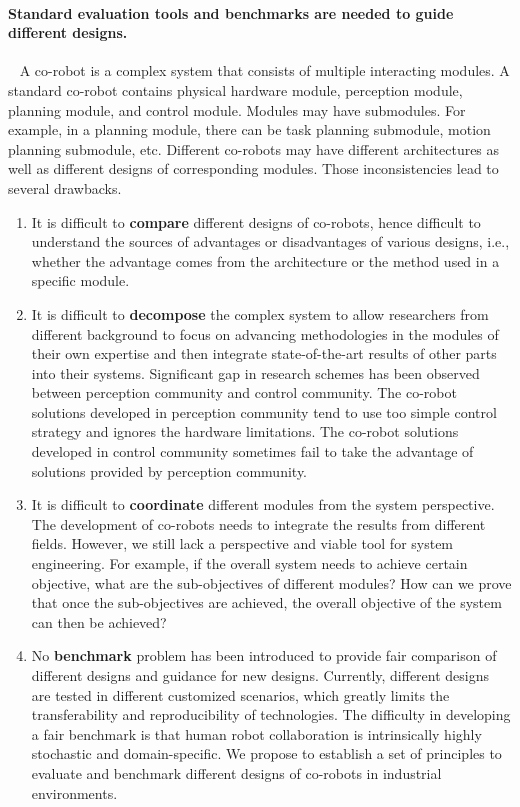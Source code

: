 \paragraph*{Standard evaluation tools and benchmarks are needed to guide different designs. }~
A co-robot is a complex system that consists of multiple interacting modules. A standard co-robot contains physical hardware module, perception module, planning module, and control module. Modules may have submodules. For example, in a planning module, there can be task planning submodule, motion planning submodule, etc. Different co-robots may have different architectures as well as different designs of corresponding modules. Those inconsistencies lead to several drawbacks.
\begin{enumerate}
	\item It is difficult to \textbf{compare} different designs of co-robots, hence difficult to understand the sources of advantages or disadvantages of various designs, i.e., whether the advantage comes from the architecture or the method used in a specific module.
	\item It is difficult to \textbf{decompose} the complex system to allow researchers from different background to focus on advancing methodologies in the modules of their own expertise and then integrate state-of-the-art results of other parts into their systems. Significant gap in research schemes has been observed between perception community and control community. The co-robot solutions developed in perception community tend to use too simple control strategy and ignores the hardware limitations. The co-robot solutions developed in control community sometimes fail to take the advantage of solutions provided by perception community.
	\item It is difficult to \textbf{coordinate} different modules from the system perspective. The development of co-robots needs to integrate the results from different fields. However, we still lack a perspective and viable tool for system engineering. For example, if the overall system needs to achieve certain objective, what are the sub-objectives of different modules? How can we prove that once the sub-objectives are achieved, the overall objective of the system can then be achieved?
	\item No \textbf{benchmark} problem has been introduced to provide fair comparison of different designs and guidance for new designs. Currently, different designs are tested in different customized scenarios, which greatly limits the transferability and reproducibility of technologies. The difficulty in developing a fair benchmark is that human robot collaboration is intrinsically highly stochastic and domain-specific.  
	We propose to establish a set of principles to evaluate and benchmark different designs of  co-robots in industrial environments. 
\end{enumerate}

